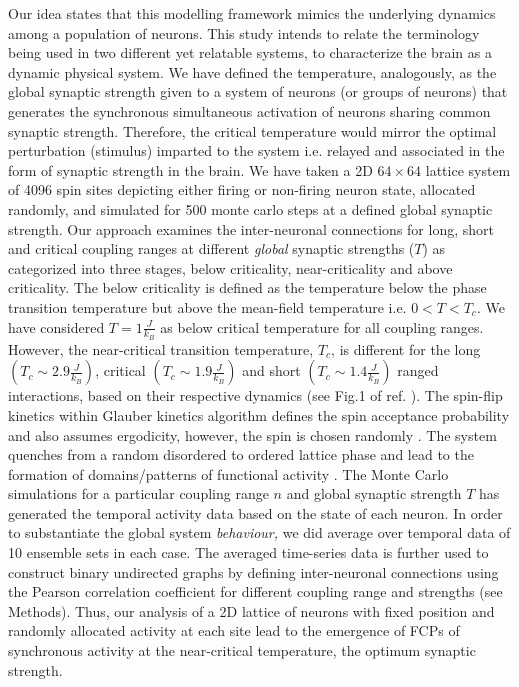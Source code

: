 \documentclass[preprintnumbers,amsmath,amssymb,onecolumn]{revtex4}
\begin{document}
{\noindent}Our idea states that this modelling framework mimics the underlying dynamics among a population of neurons. This study intends to relate the terminology being used in two different yet relatable systems, to characterize the brain as a dynamic physical system. We have defined the temperature, analogously, as the global synaptic strength given to a system of neurons (or groups of neurons) that generates the synchronous simultaneous activation of neurons sharing common synaptic strength. Therefore, the critical temperature would mirror the optimal perturbation (stimulus) imparted to the system i.e. relayed and associated in the form of synaptic strength in the brain. We have taken a 2D $64\times 64$ lattice system of 4096 spin sites depicting either firing or non-firing neuron state, allocated randomly, and simulated for 500 monte carlo steps at a defined global synaptic strength. Our approach examines the inter-neuronal connections for long, short and critical coupling ranges at different \textit{global} synaptic strengths ($T$) as categorized into three stages, below criticality, near-criticality and above criticality. The below criticality is defined as the temperature below the phase transition temperature but above the mean-field temperature i.e. $0 < T < T_c$. We have considered $T=1\frac{J}{k_B}$ as below critical temperature for all coupling ranges. However, the near-critical transition temperature, $T_c$, is different for the long $(T_c\sim 2.9\frac{J}{k_B})$, critical $(T_c\sim 1.9\frac{J}{k_B})$ and short $(T_c\sim 1.4\frac{J}{k_B})$ ranged interactions, based on their respective dynamics (see Fig.1 of ref. \citep{Gundh2015}). The spin-flip kinetics within Glauber kinetics algorithm defines the spin acceptance probability and also assumes ergodicity, however, the spin is chosen randomly \citep{Binder1988,newman1999}. The system quenches from a random disordered to ordered lattice phase and lead to the formation of domains/patterns of functional activity \citep{Sporns2000}. The Monte Carlo simulations for a particular coupling range $n$ and global synaptic strength $T$ has generated the temporal activity data based on the state of each neuron. In order to substantiate the global system \textit{behaviour,} we did average over temporal data of 10 ensemble sets in each case. The averaged time-series data is further used to construct binary undirected graphs by defining inter-neuronal connections using the Pearson correlation coefficient for different coupling range and strengths (see Methods). Thus, our analysis of a 2D lattice of neurons with fixed position and randomly allocated activity at each site lead to the emergence of FCPs of synchronous activity at the near-critical temperature, the optimum synaptic strength. \\ 
\end{document}
